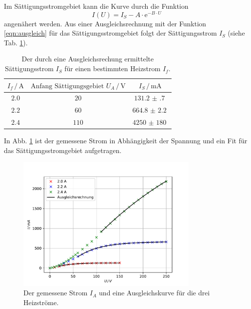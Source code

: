 \FloatBarrier
Im Sättigungsstromgebiet kann die Kurve durch die Funktion
\begin{equation}
    I(U) = I_S - A \cdot \mathrm{e}^{-B \cdot U}
    \label{eqn:ausgleich}
\end{equation} 
angenähert werden.
Aus einer Ausgleichsrechnung \cite{scipy} mit der Funktion \ref{eqn:ausgleich} für das Sättigungsstromgebiet folgt der Sättigungsstrom $I_S$ (siehe Tab. \ref{tab:saettigungsstrom}).
\begin{table}
    \centering
    \begin{tabular}{c|cc}
        \toprule
        $I_f \,/\, \si{\ampere}$ & $\text{Anfang Sättigungsgebiet } U_A \,/\, \si{\volt}$ & $I_S \,/\, \si{\milli\ampere}$ \\
        \midrule
        $2.0$ & $20$ & $\SI{131.2(7)}{}$ \\
        $2.2$ & $60$ & $\SI{664.8(22)}{}$ \\
        $2.4$ & $110$ & $\SI{4250(180)}{}$ \\
        \bottomrule
    \end{tabular}
    \caption{Der durch eine Ausgleichsrechung ermittelte Sättigungsstrom $I_S$ für einen bestimmten Heizstrom $I_f$.}
    \label{tab:saettigungsstrom}
\end{table}
In Abb. \ref{fig:kurvenchar} ist der gemessene Strom in Abhängigkeit der Spannung und ein Fit für das Sättigungsstromgebiet aufgetragen.
\begin{figure}
    \centering
    \includegraphics[width=0.8\textwidth]{content/data/saettigungsstrom.pdf}
    \caption{Der gemessene Strom $I_A$ und eine Ausgleichskurve für die drei Heizströme.\cite{matplotlib}\cite{numpy}\cite{scipy}\cite{uncertainties}}
    \label{fig:kurvenchar}
\end{figure}
\FloatBarrier


